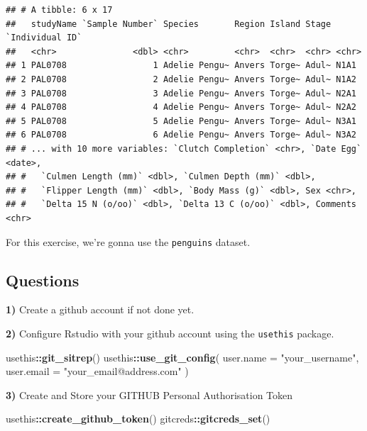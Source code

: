 \documentclass[
  12pt,
]{book}
\newenvironment{Shaded}{\begin{snugshade}}{\end{snugshade}}
\newcommand{\DataTypeTok}[1]{\textcolor[rgb]{0.13,0.29,0.53}{#1}}
\newcommand{\KeywordTok}[1]{\textcolor[rgb]{0.13,0.29,0.53}{\textbf{#1}}}
\newcommand{\NormalTok}[1]{#1}
\newcommand{\OperatorTok}[1]{\textcolor[rgb]{0.81,0.36,0.00}{\textbf{#1}}}
\newcommand{\StringTok}[1]{\textcolor[rgb]{0.31,0.60,0.02}{#1}}
\begin{document}
\begin{verbatim}
## # A tibble: 6 x 17
##   studyName `Sample Number` Species       Region Island Stage `Individual ID`
##   <chr>               <dbl> <chr>         <chr>  <chr>  <chr> <chr>          
## 1 PAL0708                 1 Adelie Pengu~ Anvers Torge~ Adul~ N1A1           
## 2 PAL0708                 2 Adelie Pengu~ Anvers Torge~ Adul~ N1A2           
## 3 PAL0708                 3 Adelie Pengu~ Anvers Torge~ Adul~ N2A1           
## 4 PAL0708                 4 Adelie Pengu~ Anvers Torge~ Adul~ N2A2           
## 5 PAL0708                 5 Adelie Pengu~ Anvers Torge~ Adul~ N3A1           
## 6 PAL0708                 6 Adelie Pengu~ Anvers Torge~ Adul~ N3A2           
## # ... with 10 more variables: `Clutch Completion` <chr>, `Date Egg` <date>,
## #   `Culmen Length (mm)` <dbl>, `Culmen Depth (mm)` <dbl>,
## #   `Flipper Length (mm)` <dbl>, `Body Mass (g)` <dbl>, Sex <chr>,
## #   `Delta 15 N (o/oo)` <dbl>, `Delta 13 C (o/oo)` <dbl>, Comments <chr>
\end{verbatim}

For this exercise, we're gonna use the \texttt{penguins} dataset.

\hypertarget{questions-1}{%
\subsection{Questions}\label{questions-1}}

\textbf{1)} Create a github account if not done yet.

\textbf{2)} Configure Rstudio with your github account using the \texttt{usethis} package.

\begin{Shaded}
\begin{Highlighting}[]
\NormalTok{usethis}\OperatorTok{::}\KeywordTok{git\_sitrep}\NormalTok{()}
\NormalTok{usethis}\OperatorTok{::}\KeywordTok{use\_git\_config}\NormalTok{(}
  \DataTypeTok{user.name =} \StringTok{"your\_username"}\NormalTok{,}
  \DataTypeTok{user.email =} \StringTok{"your\_email@address.com"}
\NormalTok{)}
\end{Highlighting}
\end{Shaded}

\textbf{3)} Create and Store your GITHUB Personal Authorisation Token

\begin{Shaded}
\begin{Highlighting}[]
\NormalTok{usethis}\OperatorTok{::}\KeywordTok{create\_github\_token}\NormalTok{()}
\NormalTok{gitcreds}\OperatorTok{::}\KeywordTok{gitcreds\_set}\NormalTok{()}
\end{Highlighting}
\end{Shaded}
\end{document}

